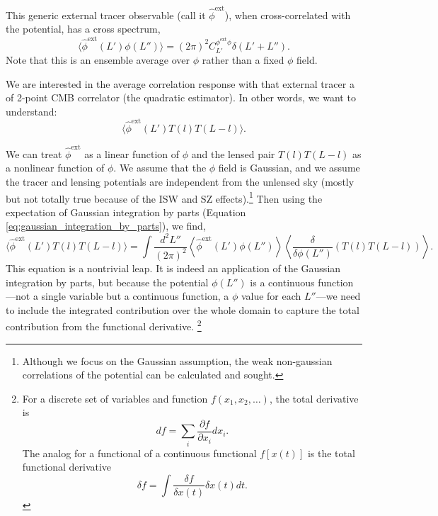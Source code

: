This generic external tracer observable (call it $\hat \phi^\textrm{ext}$), when cross-correlated with the potential, has a cross spectrum,
\begin{equation}
  \langle \hat \phi^\textrm{ext}(L') \phi(L'') \rangle = (2\pi)^2 C_{L'}^{\phi^\textrm{ext} \phi} \delta(L'+L'').
\end{equation}
Note that this is an ensemble average over $\phi$ rather than a fixed $\phi$ field.

We are interested in the average correlation response with that external tracer a of 2-point CMB correlator (the quadratic estimator). In other words, we want to understand:
\begin{equation}
\langle \hat \phi^\textrm{ext}(L') T(l) T(L-l) \rangle.
\end{equation}

We can treat $\hat \phi^\textrm{ext}$ as a linear function of $\phi$ and the lensed pair 
$T(l) T(L-l)$ as a nonlinear function of $\phi$.  We assume that the $\phi$ field is Gaussian, and we assume the tracer and lensing potentials are independent from the unlensed sky (mostly but not totally true because of the ISW and SZ effects).\footnote{Although we focus on the Gaussian assumption, the weak non-gaussian correlations of the potential can be calculated and sought.}  Then using the expectation of Gaussian integration by parts (Equation \ref{eq:gaussian_integration_by_parts}), we find,
\begin{equation}
\langle \hat \phi^\textrm{ext}(L') T(l) T(L-l) \rangle =  \int \frac{d^2L''}{(2\pi)^2} \left\langle \hat \phi^\textrm{ext}(L') \phi(L'') \right\rangle \left\langle \frac{\delta}{\delta \phi(L'')} \left(  T(l) T(L-l)  \right)  \right\rangle.
\end{equation}
This equation is a nontrivial leap.  It is indeed an application of the Gaussian integration by parts, but because the potential $\phi(L'')$ is a continuous function---not a single variable but a continuous function, a $\phi$ value for each $L''$---we need to include the integrated contribution over the whole domain to capture the total contribution from the functional derivative.%
\footnote{For a discrete set of variables and function $f(x_1,x_2,\dots)$, the total derivative is \begin{equation}df = \sum_i \frac{\partial f}{\partial x_i} dx_i.  \end{equation}  The analog for a functional of a continuous functional $f[x(t)]$ is the total functional derivative \begin{equation}\delta f = \int  \frac{\delta f}{\delta x(t)} \delta x(t) dt.\end{equation}}

